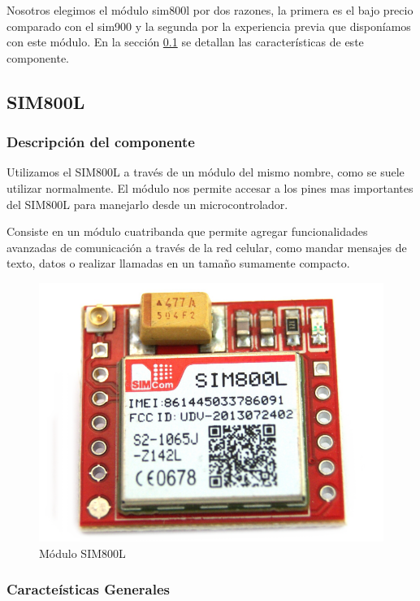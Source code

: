 Nosotros elegimos el módulo sim800l por dos razones, la primera es el bajo precio comparado con el sim900 y la segunda por la experiencia previa
que disponíamos con este módulo.
En la sección \ref{cap:sim800l} se detallan las características de este componente.


\subsection{SIM800L} \label {cap:sim800l}

\subsubsection{Descripción del componente}

Utilizamos el SIM800L a través de un módulo del mismo nombre, como se suele utilizar normalmente. El módulo nos permite accesar a los pines 
mas importantes del SIM800L para manejarlo desde un microcontrolador.\par
Consiste en un módulo cuatribanda que permite agregar funcionalidades avanzadas de comunicación a través de la red celular, como mandar mensajes de texto,
datos o realizar llamadas en un tamaño sumamente compacto. 

\begin{figure}[htb]
	\centering
	\includegraphics[scale=0.2]{images/sim800l.png}
    \caption{Módulo SIM800L}
	\label{fig:sim800l}
\end{figure}

\subsubsection{Caracteísticas Generales}

